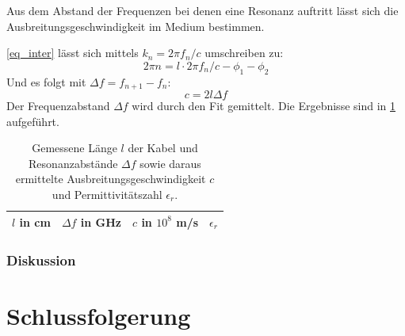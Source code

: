 \documentclass[
	a4paper,
	12pt,
	pagesize,
	ngerman
]{scrartcl}
\begin{document}
	Aus dem Abstand der Frequenzen bei denen eine Resonanz auftritt lässt sich die Ausbreitungsgeschwindigkeit im Medium bestimmen.

	\cref{eq_inter} lässt sich mittels $k_n = 2\pi f_n/c$ umschreiben zu:
	\begin{equation}
		2\pi n = l\cdot2\pi f_n /c -\phi_1 - \phi_2
	\end{equation}
	Und es folgt mit $\Delta f = f_{n+1}-f_n$:
	\begin{equation}
	c = 2l\Delta f
	\end{equation}
	Der Frequenzabstand $\Delta f$ wird durch den Fit gemittelt.
	Die Ergebnisse sind in \cref{tb_res} aufgeführt.

\begin{table}[H]
	\centering
	\begin{tabular}{ c | c | c | c }
		 $l$ in \si{cm} & $\Delta f$ in \si{GHz} &  $c$ in $10^8$ \si{m/s} & $\epsilon_r$ \\ \hline
		 
	\end{tabular}
	\caption{
	Gemessene Länge $l$ der Kabel und Resonanzabstände $\Delta f$ sowie daraus ermittelte Ausbreitungsgeschwindigkeit $c$ und Permittivitätszahl $\epsilon_r$.
	}
	\label{tb_res}
\end{table}
	\subsubsection*{Diskussion}

	\section{Schlussfolgerung}

	\printbibliography
\end{document}
